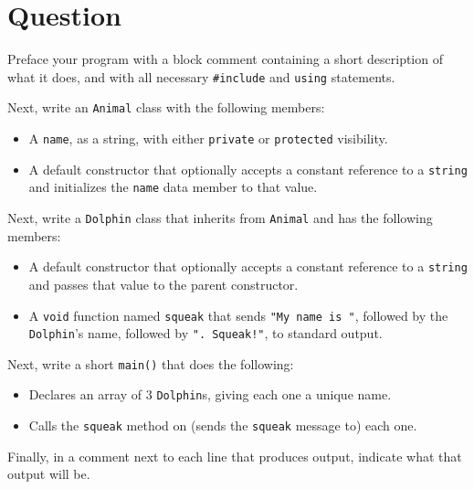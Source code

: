 \newpage

\section{Question}

Preface your program with a block comment containing a short description of
what it does, and with all necessary \texttt{#include} and
\texttt{using} statements.

Next, write an \texttt{Animal} class with the following members:
\begin{itemize}
  \item A \texttt{name}, as a string, with either
    \texttt{private} or \texttt{protected} visibility.
  \item A default constructor that optionally accepts a constant reference to a
    \texttt{string} and initializes the \texttt{name} data
    member to that value.
\end{itemize}

Next, write a \texttt{Dolphin} class that inherits from
\texttt{Animal} and has the following members:
\begin{itemize}
  \item A default constructor that optionally accepts a constant reference to a
    \texttt{string} and passes that value to the parent constructor.
  \item A \texttt{void} function named \texttt{squeak} that
    sends \texttt{"My name is "}, followed by the
    \texttt{Dolphin}'s name, followed by
    \texttt{".  Squeak!\n"}, to standard output.
\end{itemize}

Next, write a short \texttt{main()} that does the following:
\begin{itemize}
  \item Declares an array of 3 \texttt{Dolphin}s, giving each one a
    unique name.
  \item Calls the \texttt{squeak} method on (sends the
    \texttt{squeak} message to) each one.
\end{itemize}

Finally, in a comment next to each line that produces output, indicate what
that output will be.

